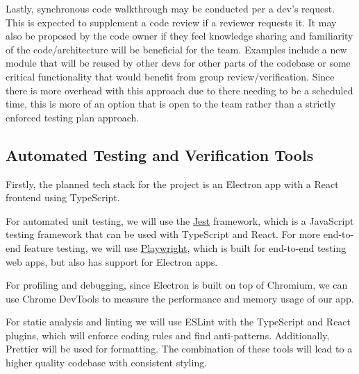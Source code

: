 \documentclass[12pt, titlepage]{article}
\begin{document}
Lastly, synchronous code walkthrough may be conducted per a dev's request. This
is expected to supplement a code review if a reviewer requests it. It may also
be proposed by the code owner if they feel knowledge sharing and familiarity of
the code/architecture will be beneficial for the team. Examples include a new
module that will be reused by other devs for other parts of the codebase or
some critical functionality that would benefit from group review/verification.
Since there is more overhead with this approach due to there needing to be a
scheduled time, this is more of an option that is open to the team rather than
a strictly enforced testing plan approach.

\subsection{Automated Testing and Verification Tools}




Firstly, the planned tech stack for the project is an Electron app with a
React frontend using TypeScript.

For automated unit testing, we will use the \href{https://jestjs.io/}{Jest}
framework, which is a JavaScript testing framework that can be used with
TypeScript and React. For more end-to-end feature testing, we will use
\href{https://playwright.dev/}{Playwright}, which is built for end-to-end
testing web apps, but also has support for Electron apps.

For profiling and debugging, since Electron is built on top of Chromium, we can
use Chrome DevTools to measure the performance and memory usage of our app.

For static analysis and linting we will use ESLint with the TypeScript and
React plugins, which will enforce coding rules and find anti-patterns.
Additionally, Prettier will be used for formatting. The combination of these
tools will lead to a higher quality codebase with consistent styling.
\end{document}
